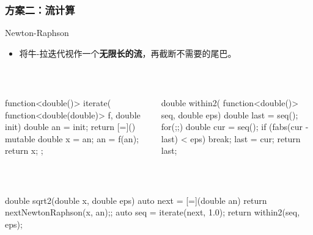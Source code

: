 \documentclass[UTF8,lualatex]{ctexbeamer}
\renewcommand{\emph}[1]{\textbf{#1}}
\begin{document}
\begin{frame}[fragile,t]
    \frametitle{方案二：流计算}
    \begin{block}{Newton-Raphson}
        \begin{itemize}
            \item 将牛-拉迭代视作一个\emph{无限长的流}，再截断不需要的尾巴。
        \end{itemize}
    \end{block}
    \vspace{-0.5cm}
    \scriptsize
    \begin{columns}[t]
        \begin{column}{.42\textwidth}
            \begin{exampleblock}{~}
                \begin{cppcode}
                    function<double()> iterate(
                      function<double(double)> f,
                      double init) {
                        double an = init;
                        return [=]() mutable {
                            double x = an;
                            an = f(an);
                            return x;
                        };
                    }
                \end{cppcode}
            \end{exampleblock}
        \end{column}
        \begin{column}{.58\textwidth}
            \begin{exampleblock}{~}
                \begin{cppcode}
                    double within2(
                      function<double()> seq, double eps) {
                        double last = seq();
                        for(;;) {
                            double cur = seq();
                            if (fabs(cur - last) < eps) break;
                            last = cur;
                        }
                        return last;
                    }
                \end{cppcode}
            \end{exampleblock}
        \end{column}
    \end{columns}
    \begin{exampleblock}{~}
        \begin{cppcode}
            double sqrt2(double x, double eps) {
              auto next = [=](double an) {return nextNewtonRaphson(x, an);};
              auto seq = iterate(next, 1.0);
              return within2(seq, eps);
            }
        \end{cppcode}
    \end{exampleblock}
\end{frame}
\end{document}
